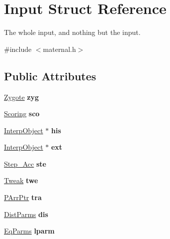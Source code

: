 \hypertarget{structInput}{
\section{Input Struct Reference}
\label{structInput}
}


The whole input, and nothing but the input.  


{\ttfamily \#include $<$maternal.h$>$}\subsection*{Public Attributes}
\begin{DoxyCompactItemize}
\item 
\hypertarget{structInput_a326e6b53ceae20fe4dba03f48b9402ea}{
\hyperlink{structZygote}{Zygote} {\bfseries zyg}}
\label{structInput_a326e6b53ceae20fe4dba03f48b9402ea}

\item 
\hypertarget{structInput_ae4b16fbe0fa487fa9d7f4751063ea500}{
\hyperlink{structScoring}{Scoring} {\bfseries sco}}
\label{structInput_ae4b16fbe0fa487fa9d7f4751063ea500}

\item 
\hypertarget{structInput_af11e2f450b43c341478b6708f208bb74}{
\hyperlink{structInterpObject}{InterpObject} $\ast$ {\bfseries his}}
\label{structInput_af11e2f450b43c341478b6708f208bb74}

\item 
\hypertarget{structInput_a7e30738333802bebe71456c1d65d64d1}{
\hyperlink{structInterpObject}{InterpObject} $\ast$ {\bfseries ext}}
\label{structInput_a7e30738333802bebe71456c1d65d64d1}

\item 
\hypertarget{structInput_a06008da4d4fd7ef7226e0c9c6c6576d9}{
\hyperlink{structStep__Acc}{Step\_\-Acc} {\bfseries ste}}
\label{structInput_a06008da4d4fd7ef7226e0c9c6c6576d9}

\item 
\hypertarget{structInput_a0ff0671972fa6a148632a4c9d26c4fe4}{
\hyperlink{structTweak}{Tweak} {\bfseries twe}}
\label{structInput_a0ff0671972fa6a148632a4c9d26c4fe4}

\item 
\hypertarget{structInput_afd3084df66ebad564399f4889da9c505}{
\hyperlink{structPArrPtr}{PArrPtr} {\bfseries tra}}
\label{structInput_afd3084df66ebad564399f4889da9c505}

\item 
\hypertarget{structInput_a83e1822e85c21d30575e71e2f4b1653e}{
\hyperlink{structmy__distrib}{DistParms} {\bfseries dis}}
\label{structInput_a83e1822e85c21d30575e71e2f4b1653e}

\item 
\hypertarget{structInput_a561962ca6aa19015ad67ae34de6c02ce}{
\hyperlink{structEqParms}{EqParms} {\bfseries lparm}}
\label{structInput_a561962ca6aa19015ad67ae34de6c02ce}

\end{DoxyCompactItemize}


